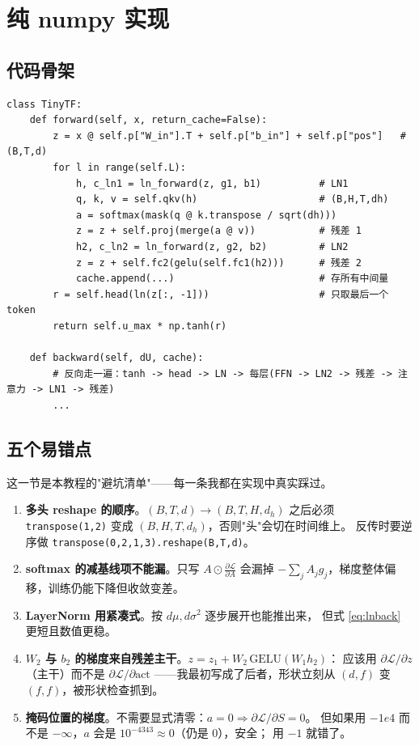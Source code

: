 \chapter{纯 numpy 实现}
\section{代码骨架}

\begin{lstlisting}[caption={tinytf\_numpy.py 的核心结构}]
class TinyTF:
    def forward(self, x, return_cache=False):
        z = x @ self.p["W_in"].T + self.p["b_in"] + self.p["pos"]   # (B,T,d)
        for l in range(self.L):
            h, c_ln1 = ln_forward(z, g1, b1)          # LN1
            q, k, v = self.qkv(h)                     # (B,H,T,dh)
            a = softmax(mask(q @ k.transpose / sqrt(dh)))
            z = z + self.proj(merge(a @ v))           # 残差 1
            h2, c_ln2 = ln_forward(z, g2, b2)         # LN2
            z = z + self.fc2(gelu(self.fc1(h2)))      # 残差 2
            cache.append(...)                         # 存所有中间量
        r = self.head(ln(z[:, -1]))                   # 只取最后一个 token
        return self.u_max * np.tanh(r)

    def backward(self, dU, cache):
        # 反向走一遍：tanh -> head -> LN -> 每层(FFN -> LN2 -> 残差 -> 注意力 -> LN1 -> 残差)
        ...
\end{lstlisting}

\section{五个易错点}

这一节是本教程的"避坑清单"——每一条我都在实现中真实踩过。

\begin{enumerate}[leftmargin=1.6em,itemsep=4pt]
  \item \textbf{多头 reshape 的顺序}。$(B,T,d)\to(B,T,H,d_h)$ 之后必须
        \texttt{transpose(1,2)} 变成 $(B,H,T,d_h)$，否则"头"会切在时间维上。
        反传时要逆序做 \texttt{transpose(0,2,1,3).reshape(B,T,d)}。
  \item \textbf{softmax 的减基线项不能漏}。只写 $A\odot\frac{\partial\mathcal{L}}{\partial A}$
        会漏掉 $-\sum_jA_jg_j$，梯度整体偏移，训练仍能下降但收敛变差。
  \item \textbf{LayerNorm 用紧凑式}。按 $d\mu,d\sigma^2$ 逐步展开也能推出来，
        但式 \eqref{eq:lnback} 更短且数值更稳。
  \item \textbf{$W_2$ 与 $b_2$ 的梯度来自残差主干}。$z=z_1+W_2\,\mathrm{GELU}(W_1h_2)$：
        应该用 $\partial\mathcal{L}/\partial z$（主干）而不是 $\partial\mathcal{L}/\partial \mathrm{act}$
        ——我最初写成了后者，形状立刻从 $(d,f)$ 变 $(f,f)$，被形状检查抓到。
  \item \textbf{掩码位置的梯度}。不需要显式清零：$a=0\Rightarrow \partial\mathcal{L}/\partial S=0$。
        但如果用 $-1e4$ 而不是 $-\infty$，$a$ 会是 $10^{-4343}\approx0$（仍是 $0$），安全；
        用 $-1$ 就错了。
\end{enumerate}

